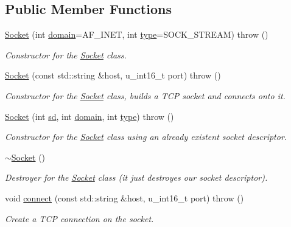\subsection*{Public Member Functions}
\begin{CompactItemize}
\item 
\hyperlink{classSocket_08ec85e71ecfde6ee952624696b3e1cb}{Socket} (int \hyperlink{classSocket_8b042d9fe02795041a5e045604c8b7ec}{domain}=AF\_\-INET, int \hyperlink{classSocket_c7f6980f36023df2004271c336217cb8}{type}=SOCK\_\-STREAM)  throw ()
\begin{CompactList}\small\item\em Constructor for the \hyperlink{classSocket}{Socket} class. \item\end{CompactList}\item 
\hyperlink{classSocket_07d73b007fcdfa7cc4b8b90820b563de}{Socket} (const std::string \&host, u\_\-int16\_\-t port)  throw ()
\begin{CompactList}\small\item\em Constructor for the \hyperlink{classSocket}{Socket} class, builds a TCP socket and connects onto it. \item\end{CompactList}\item 
\hyperlink{classSocket_c95777f24c2c8e076ff6084ecb139884}{Socket} (int \hyperlink{classSocket_d9e40b6c9a69e0168c27962cc6c60ef7}{sd}, int \hyperlink{classSocket_8b042d9fe02795041a5e045604c8b7ec}{domain}, int \hyperlink{classSocket_c7f6980f36023df2004271c336217cb8}{type})  throw ()
\begin{CompactList}\small\item\em Constructor for the \hyperlink{classSocket}{Socket} class using an already existent socket descriptor. \item\end{CompactList}\item 
\hyperlink{classSocket_eac4eb6379a543d38ed88977d3b6630a}{$\sim$Socket} ()
\begin{CompactList}\small\item\em Destroyer for the \hyperlink{classSocket}{Socket} class (it just destroyes our socket descriptor). \item\end{CompactList}\item 
void \hyperlink{classSocket_6aea9340963adc8f277d1bbf28175954}{connect} (const std::string \&host, u\_\-int16\_\-t port)  throw ()
\begin{CompactList}\small\item\em Create a TCP connection on the socket. \item\end{CompactList}\item 

\end{CompactItemize}
